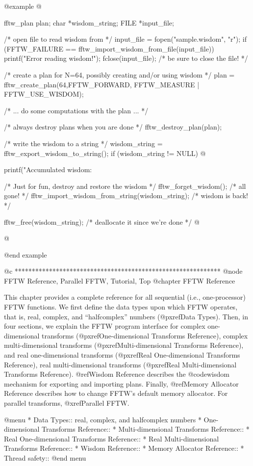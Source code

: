 @example
@{
     fftw_plan plan;
     char *wisdom_string;
     FILE *input_file;

     /* open file to read wisdom from */
     input_file = fopen("sample.wisdom", "r");
     if (FFTW_FAILURE == fftw_import_wisdom_from_file(input_file))
          printf("Error reading wisdom!\n");
     fclose(input_file); /* be sure to close the file! */

     /* create a plan for N=64, possibly creating and/or using wisdom */
     plan = fftw_create_plan(64,FFTW_FORWARD,
                             FFTW_MEASURE | FFTW_USE_WISDOM);

     /* ... do some computations with the plan ... */

     /* always destroy plans when you are done */
     fftw_destroy_plan(plan);

     /* write the wisdom to a string */
     wisdom_string = fftw_export_wisdom_to_string();
     if (wisdom_string != NULL) @{
          printf("Accumulated wisdom: %

          /* Just for fun, destroy and restore the wisdom */
          fftw_forget_wisdom(); /* all gone! */
          fftw_import_wisdom_from_string(wisdom_string);
          /* wisdom is back! */

          fftw_free(wisdom_string); /* deallocate it since we're done */
     @}
@}
@end example

@c ************************************************************
@node FFTW Reference, Parallel FFTW, Tutorial, Top
@chapter FFTW Reference

This chapter provides a complete reference for all sequential (i.e.,
one-processor) FFTW functions.  We first define the data types upon
which FFTW operates, that is, real, complex, and ``halfcomplex'' numbers
(@pxref{Data Types}).  Then, in four sections, we explain the FFTW
program interface for complex one-dimensional transforms
(@pxref{One-dimensional Transforms Reference}), complex
multi-dimensional transforms (@pxref{Multi-dimensional Transforms
Reference}), and real one-dimensional transforms (@pxref{Real
One-dimensional Transforms Reference}), real multi-dimensional
transforms (@pxref{Real Multi-dimensional Transforms Reference}).
@ref{Wisdom Reference} describes the @code{wisdom} mechanism for
exporting and importing plans.  Finally, @ref{Memory Allocator
Reference} describes how to change FFTW's default memory allocator.
For parallel transforms, @xref{Parallel FFTW}.

@menu
* Data Types::                  real, complex, and halfcomplex numbers
* One-dimensional Transforms Reference::  
* Multi-dimensional Transforms Reference::  
* Real One-dimensional Transforms Reference::  
* Real Multi-dimensional Transforms Reference::  
* Wisdom Reference::            
* Memory Allocator Reference::  
* Thread safety::               
@end menu


